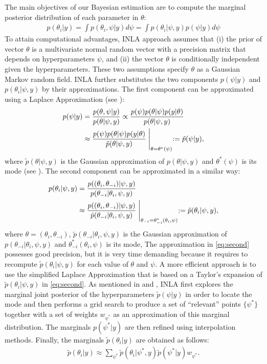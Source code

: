 \documentclass[12pt]{amsart}
\theoremstyle{plain}
\theoremstyle{definition}
\theoremstyle{remark}
\begin{document}
The main objectives of our Bayesian estimation are to compute the
marginal posterior distribution of each parameter in $\theta$:
\begin{align*}
  p(\theta_i|y) = \int p(\theta_i,\psi|y)d \psi = \int p(\theta_i|\psi,y)p(\psi|y)d \psi
\end{align*}
To attain computational advantages, INLA approach assumes that (i) the prior of vector $\theta$ is a multivariate normal random vector with a precision matrix that depends on hyperparameters $\psi$, and (ii) the vector
$\theta$ is conditionally independent given the hyperparameters. These two
assumptions specify $\theta$ as a Gaussian Markov random field. INLA further 
substitutes the two components $p(\psi|y)$ and $p(\theta_i|\psi,y)$ by their approximations. The first component can be approximated using a
Laplace Approximation (see \cite{Tierney1986}):
\begin{align*}
  p(\psi|y)&=\frac{p(\theta,\psi|y)}{p(\theta|\psi,y)}\propto \frac{p(\psi)p(\theta|\psi)p(y|\theta)}{p(\theta|\psi,y)}\\
           & \approx  \frac{p(\psi)p(\theta|\psi)p(y|\theta)}{\tilde p(\theta|\psi,y)} \Biggm |_{\theta=\theta^*(\psi)} := \tilde p(\psi|y),
\end{align*}
where $\tilde p(\theta|\psi,y)$ is the Gaussian approximation of
$p(\theta|\psi,y)$ and $\theta^*(\psi)$ is its mode (see \cite{Rue2009}). The
second component can be approximated in a similar way:
\begin{align}\label{eq:second}
  p(\theta_i|\psi,y)&=\frac{p((\theta_i,\theta_{-i})|\psi,y)}{p(\theta_{-i}|\theta_i,\psi,y)} \notag \\
  &\approx \frac{p((\theta_i,\theta_{-i})|\psi,y)}{\tilde p(\theta_{-i}|\theta_i,\psi,y)} \Biggm |_{\theta_{-i}=\theta_{-i}^*(\theta_i,\psi)}:=\tilde p(\theta_i|\psi,y),
\end{align}
where $\theta=(\theta_i,\theta_{-i})$, $\tilde p(\theta_{-i}|\theta_i,\psi,y)$ is the Gaussian approximation of
$p(\theta_{-i}|\theta_i,\psi,y)$ and $\theta_{-i}^*(\theta_i,\psi)$ is its mode,  
The approximation in \eqref{eq:second} possesses good precision, but it is very time demanding because it
requires to recompute $\tilde p(\theta_i|\psi,y)$ for each value of $\theta$ and $\psi$. A
more efficient approach is to use the simplified Laplace Approximation that is
based on a Taylor's expansion of $\tilde p(\theta_i|\psi,y)$ in 
\eqref{eq:second}. As mentioned in \cite{Rue2009} and \cite{Blangiardo2013},
INLA first explores the marginal joint posterior of the hyperparameters $\tilde
p(\psi | y)$ in order to locate the mode and then performs a grid search to 
produce a set of ``relevant'' points $\{\psi^*\}$ together with a set of weights
$w_{\psi^*}$ as an approximation of this marginal distribution. The marginals
$p(\psi^*|y)$ are then refined using interpolation methods. Finally, the marginals
$\tilde p(\theta_i|y)$ are obtained as follows:
\begin{align*}
  \tilde p(\theta_i|y) \approx \sum_{\psi^*}\tilde p(\theta_i|\psi^*,y)\tilde p(\psi^*|y)w_{\psi^*}.
\end{align*}
\end{document}
